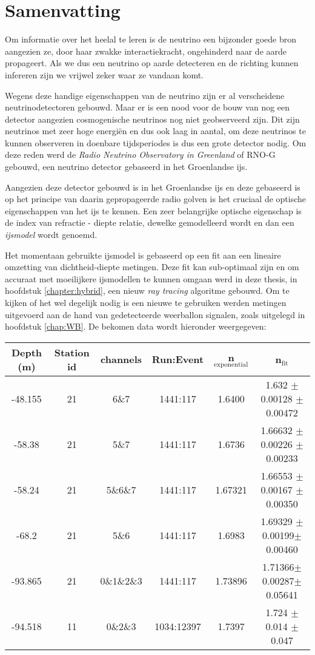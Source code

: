 \chapter*{Samenvatting}
Om informatie over het heelal te leren is de neutrino een bijzonder goede bron aangezien
ze, door haar zwakke interactiekracht, ongehinderd naar de aarde propageert.
Als we dus een neutrino op aarde detecteren en de richting kunnen infereren zijn we
vrijwel zeker waar ze vandaan komt.

Wegens deze handige eigenschappen van de neutrino zijn er al verscheidene neutrinodetectoren gebouwd.
Maar er is een nood voor de bouw van nog een detector aangezien cosmogenische neutrinos nog niet
geobserveerd zijn. Dit zijn neutrinos met zeer hoge energiën en dus ook laag in aantal,
om deze neutrinos te kunnen observeren in doenbare tijdsperiodes is dus een grote detector nodig.
Om deze reden werd de \textit{Radio Neutrino Observatory in Greenland} of RNO-G gebouwd, een 
neutrino detector gebaseerd in het Groenlandse ijs.

Aangezien deze detector gebouwd is in het Groenlandse ijs en deze gebaseerd is
op het principe van daarin gepropageerde radio golven is het cruciaal de
optische eigenschappen van het ijs te kennen. Een zeer belangrijke optische
eigenschap is de index van refractie - diepte relatie, dewelke gemodelleerd wordt
en dan een \textit{ijsmodel} wordt genoemd.

Het momentaan gebruikte ijsmodel is gebaseerd op een fit aan een lineaire omzetting van dichtheid-diepte metingen.
Deze fit kan sub-optimaal zijn en om accuraat met moeilijkere ijsmodellen
te kunnen omgaan werd in deze thesis, in hoofdstuk \ref{chapter:hybrid}, een nieuw \textit{ray tracing}
algoritme gebouwd. Om te kijken of het wel degelijk nodig is een nieuwe te gebruiken werden 
metingen uitgevoerd aan de hand van gedetecteerde weerballon signalen, zoals uitgelegd in hoofdstuk \ref{chap:WB}. 
De bekomen data wordt hieronder weergegeven:
\begin{center}
\begin{tabular}{||c c c c c c||}
 \hline
 Depth (m) & Station id & channels & Run:Event & n$_\text{exponential}$ & n$_\text{fit}$\\ [0.5ex]
 \hline\hline
 -48.155 & 21 & 6\&7 & 1441:117 & 1.6400 & 1.632 $\pm$ 0.00128 $\pm$ 0.00472\\
 -58.38 & 21 & 5\&7 & 1441:117 & 1.6736 & 1.66632 $\pm$ 0.00226 $\pm$ 0.00233 \\
 -58.24 & 21 & 5\&6\&7 & 1441:117 & 1.67321 & 1.66553 $\pm$ 0.00167 $\pm$ 0.00350 \\
 -68.2 & 21 & 5\&6 & 1441:117 & 1.6983 & 1.69329 $\pm$0.00199$\pm$0.00460 \\
 -93.865 & 21 & 0\&1\&2\&3 & 1441:117 & 1.73896 & 1.71366$\pm$0.00287$\pm$0.05641\\
 -94.518 & 11 & 0\&2\&3 & 1034:12397 & 1.7397 & 1.724 $\pm$ 0.014 $\pm$ 0.047 \\
 \hline
\end{tabular}
\end{center}

